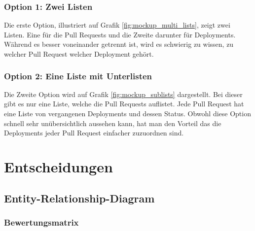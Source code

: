\subsubsection{Option 1: Zwei Listen}
Die erste Option, illustriert auf Grafik \ref{fig:mockup_multi_lists}, zeigt zwei Listen. Eine für die Pull Requests und
die Zweite darunter für Deployments. \newline
Während es besser voneinander getrennt ist, wird es schwierig zu wissen, zu welcher Pull Request welcher Deployment
gehört.

\subsubsection{Option 2: Eine Liste mit Unterlisten}
Die Zweite Option wird auf Grafik \ref{fig:mockup_sublists} dargestellt. Bei dieser gibt es nur eine Liste, welche
die Pull Requests auflistet. Jede Pull Request hat eine Liste von vergangenen Deployments und dessen Status. \newline
Obwohl diese Option schnell sehr unübersichtlich aussehen kann, hat man den Vorteil das die Deployments jeder
Pull Request einfacher zuzuordnen sind.

\newpage
\section{Entscheidungen}
\subsection{Entity-Relationship-Diagram}
\label{sec:decide_erd}
\subsubsection{Bewertungsmatrix}
\begin{center}
\end{center}
